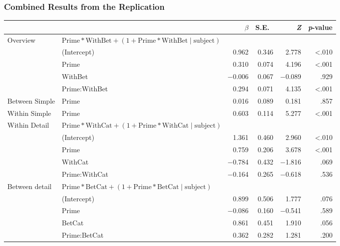 \documentclass[noamssymb]{beamer}
\begin{document}
\begin{frame}

\frametitle{{\ftf Combined Results from the Replication}}

\begin{adjustbox}{width=1\textwidth,center=\textwidth}
    \begin{tabular}{llrrrr}
      \hline
      & & \(\beta\) & S.E.\ & \emph{Z} & \emph{p}-value  \\
      \hline
      Overview & \(\text{Prime} * \text{WithBet} + (1 + \text{Prime} * \text{WithBet} \mid \text{subject})\) & & & \\
      & (Intercept)   & 0.962  & 0.346 &  2.778 & <.010 \\
      & Prime         & 0.310  & 0.074 &  4.196 & <.001 \\
      & WithBet       & \(-\)0.006 & 0.067 & \(-\)0.089 &  .929 \\
      & Prime:WithBet & 0.294  & 0.071 &  4.135 & <.001 \\
      Between Simple & Prime & 0.016 & 0.089 & 0.181 & .857  \\
      Within Simple  & Prime & 0.603 & 0.114 & 5.277 & <.001 \\
      Within Detail & \multicolumn{2}{l}{\(\text{Prime} * \text{WithCat} + (1 + \text{Prime} * \text{WithCat} \mid \text{subject})\)}  & & & \\
      & (Intercept)   &  1.361 & 0.460 &  2.960 & <.010 \\
      & Prime         &  0.759 & 0.206 &  3.678 & <.001 \\
      & WithCat       & \(-\)0.784 & 0.432 & \(-\)1.816 & .069  \\
      & Prime:WithCat & \(-\)0.164 & 0.265 & \(-\)0.618 & .536  \\
      Between detail & \multicolumn{2}{l}{\(\text{Prime} * \text{BetCat} + (1 + \text{Prime} * \text{BetCat} \mid \text{subject})\)}  & & & \\
      & (Intercept)  &  0.899 & 0.506 &  1.777 & .076 \\
      & Prime        & \(-\)0.086 & 0.160 & \(-\)0.541 & .589 \\
      & BetCat       & 0.861  & 0.451 &  1.910 & .056 \\
      & Prime:BetCat &  0.362 & 0.282 &  1.281 & .200 \\
      \hline
    \end{tabular}
  \end{adjustbox}

\end{frame}
\end{document}

